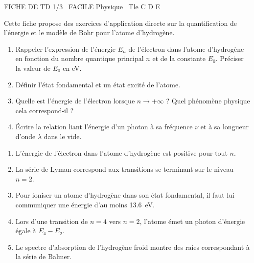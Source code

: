 \documentclass[11pt]{article}
\begin{document}
\begin{tcolorbox}[enhanced,colback=popink,colframe=popink,arc=10pt,boxrule=0pt,left=12pt,right=12pt,top=9pt,bottom=9pt]
{\color{white}\popxbold\small FICHE DE TD 1/3 \textbullet\ FACILE \hfill Physique \textbullet\ Tle C D E\par}
\end{tcolorbox}
\vspace{4pt}
Cette fiche propose des exercices d'application directe sur la quantification de l'énergie et le modèle de Bohr pour l'atome d'hydrogène.

\begin{exercice}
\begin{enumerate}
    \item Rappeler l'expression de l'énergie $E_n$ de l'électron dans l'atome d'hydrogène en fonction du nombre quantique principal $n$ et de la constante $E_0$. Préciser la valeur de $E_0$ en eV.
    \item Définir l'état fondamental et un état excité de l'atome.
    \item Quelle est l'énergie de l'électron lorsque $n \to +\infty$ ? Quel phénomène physique cela correspond-il ?
    \item Écrire la relation liant l'énergie d'un photon à sa fréquence $\nu$ et à sa longueur d'onde $\lambda$ dans le vide.
\end{enumerate}
\end{exercice}

\begin{exercice}
\begin{enumerate}
    \item L'énergie de l'électron dans l'atome d'hydrogène est positive pour tout $n$.
    \item La série de Lyman correspond aux transitions se terminant sur le niveau $n=2$.
    \item Pour ioniser un atome d'hydrogène dans son état fondamental, il faut lui communiquer une énergie d'au moins \SI{13,6}{eV}.
    \item Lors d'une transition de $n=4$ vers $n=2$, l'atome émet un photon d'énergie égale à $E_4 - E_2$.
    \item Le spectre d'absorption de l'hydrogène froid montre des raies correspondant à la série de Balmer.
\end{enumerate}
\end{exercice}
\end{document}
